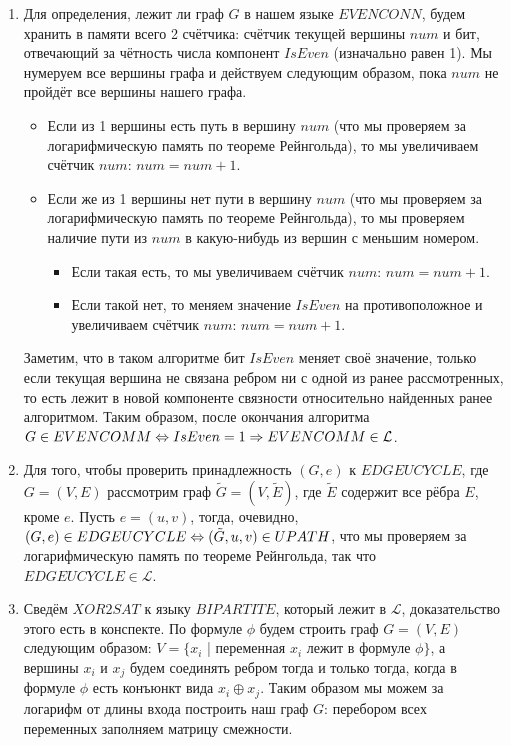 \documentclass[a4paper,12pt]{article}
\begin{document}
\begin{solution}
	\begin{enumerate}
		\item Для определения, лежит ли граф $G$ в нашем языке $EVENCONN$, будем хранить в памяти всего 2 счётчика: счётчик текущей вершины $num$ и бит, отвечающий за чётность числа компонент $IsEven$ (изначально равен 1). Мы нумеруем все вершины графа и действуем следующим образом, пока $num$ не пройдёт все вершины нашего графа.
		
		\begin{itemize}
		\item Если из 1 вершины есть путь в вершину $num$ (что мы проверяем за логарифмическую память по теореме Рейнгольда), то мы увеличиваем счётчик $num$: $num = num + 1$.
		
		\item Если же из 1 вершины нет пути в вершину $num$ (что мы проверяем за логарифмическую память по теореме Рейнгольда), то мы проверяем наличие пути из $num$ в какую-нибудь из вершин с меньшим номером. 
		
		\begin{itemize}
			\item Если такая есть, то мы увеличиваем счётчик $num$: $num = num + 1$.
			\item Если такой нет, то меняем значение $IsEven$ на противоположное и увеличиваем счётчик $num$: $num = num + 1$.
		\end{itemize}		
	\end{itemize}

	Заметим, что в таком алгоритме бит $IsEven$ меняет своё значение, только если текущая вершина не связана ребром ни с одной из ранее рассмотренных, то есть лежит в новой компоненте связности относительно найденных ранее алгоритмом. Таким образом, после окончания алгоритма $G \in EVENCOMM \Leftrightarrow IsEven = 1 \Rightarrow EVENCOMM \in \mathcal{L}$.

	\item Для того, чтобы проверить принадлежность $(G, e)$ к $EDGEUCYCLE$, где $G = (V, E)$ рассмотрим граф $\tilde{G} = (V, \tilde{E})$, где $\tilde{E}$ содержит все рёбра $E$, кроме $e$. Пусть $e = (u, v)$, тогда, очевидно, $(G, e) \in EDGEUCYCLE \Leftrightarrow (\tilde{G}, u, v) \in UPATH$, что мы проверяем за логарифмическую память по теореме Рейнгольда, так что $EDGEUCYCLE \in \mathcal{L}$.
	
	\item Сведём $XOR2SAT$ к языку $BIPARTITE$, который лежит в $\mathcal{L}$, доказательство этого есть в конспекте. По формуле $\phi$ будем строить граф $G = (V, E)$ следующим образом: $V = \{x_i$ | переменная $x_i$ лежит в формуле $\phi\}$, а вершины $x_i$ и $x_j$ будем соединять ребром тогда и только тогда, когда в формуле $\phi$ есть конъюнкт вида $x_i \oplus x_j$. Таким образом мы можем за логарифм от длины входа построить наш граф $G$: перебором всех переменных заполняем матрицу смежности.
	

\end{enumerate}
\end{solution}
\end{document}
